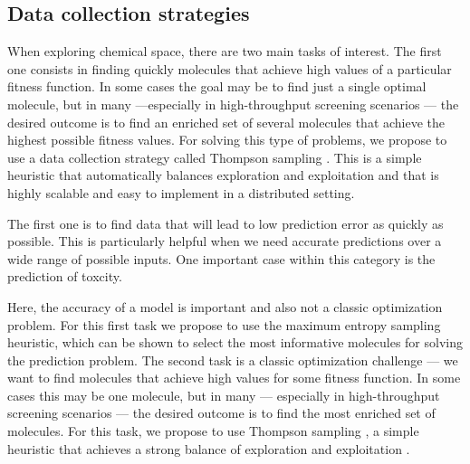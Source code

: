 \subsection{Data collection strategies}

When exploring chemical space, there are two main tasks of interest. The first one consists in finding quickly molecules that achieve high values of a particular fitness function. In some cases the goal may be to find just a single optimal molecule, but in many ---especially in high-throughput screening scenarios \cite{pyzer-knapp_what_2015}--- the desired outcome is to find 
an enriched set of several molecules that achieve the highest possible fitness values. For solving this type of problems, we propose to use a data collection strategy called Thompson sampling \cite{thompson_likelihood_1933}. This is a simple heuristic that automatically balances exploration and exploitation \cite{Chapelle2011} and that is highly scalable and easy to implement in a distributed setting.

The first one is to find data that will lead to low prediction error as quickly as possible. This is particularly helpful when we need accurate predictions over a wide range of possible inputs. One important case within this category is the prediction of toxcity. 

Here, the accuracy of a model is important and  also not a classic optimization problem. For this first task we propose to use the maximum entropy sampling heuristic, which can be shown to select the most informative molecules for solving
the prediction problem.  The second task is a classic optimization challenge --- we want to find molecules that achieve high values for some fitness
function.  In some cases this may be one molecule, but in many --- especially in high-throughput screening scenarios \cite{pyzer-knapp_what_2015} --- the
desired outcome is to find the most enriched set of molecules. For this task, we propose to use Thompson sampling \cite{thompson_likelihood_1933}, a simple
heuristic that achieves a strong balance of exploration and exploitation \cite{Chapelle2011}.